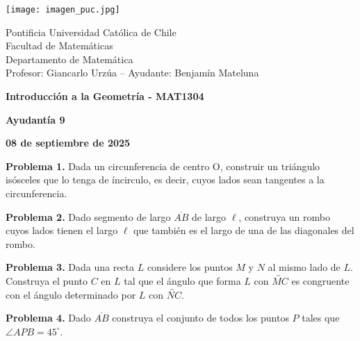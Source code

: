 \documentclass{article}
\begin{document}
\begin{minipage}{2.5cm}
    \texttt{[image: imagen\_puc.jpg]}
\end{minipage}
\begin{minipage}{14cm}
    {\sc Pontificia Universidad Católica de Chile\\
    Facultad de Matemáticas\\
    Departamento de Matemática\\
    Profesor: Giancarlo Urzúa -- Ayudante: Benjamín Mateluna}
\end{minipage}
\vspace{1ex}

{\centerline{\bf Introducción a la Geometría - MAT1304}
\centerline{\bf Ayudantía 9}}
\centerline{\bf 08 de septiembre de 2025}

\vspace{1cm}
\noindent\textbf{Problema 1.} Dada un circunferencia de centro O, construir un triángulo isósceles
que lo tenga de íncirculo, es decir, cuyos lados sean tangentes a la circunferencia.

\vspace{5mm}
\noindent\textbf{Problema 2.} Dado segmento de largo $\overline{AB}$ de largo $\ell$, construya un
rombo cuyos lados tienen el largo $\ell$ que también es el largo de una de las diagonales del 
rombo.

\vspace{5mm}
\noindent\textbf{Problema 3.} Dada una recta $L$ considere los puntos $M$ y $N$ al mismo lado de
$L$. Construya el punto $C$ en $L$ tal que el ángulo que forma $L$ con $\overleftrightarrow{MC}$
es congruente con el ángulo determinado por $L$ con $\overleftrightarrow{NC}$.

\vspace{5mm}
\noindent\textbf{Problema 4.} Dado $\overline{AB}$ construya el conjunto de todos los puntos $P$
tales que $\angle APB=45^{\circ}$.

\end{document}
